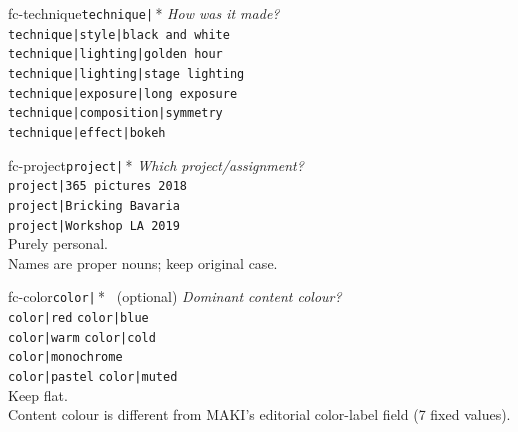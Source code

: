 \documentclass[a3paper,landscape,10pt]{article}
\newcommand{\cmd}[1]{\texttt{\small #1}}
\begin{document}
\begin{minipage}[t]{0.64\textwidth}
  \noindent
  \begin{minipage}[t]{0.244\textwidth}\begin{facetcard}{fc-technique}{\texttt{technique|}\,*}
    \textit{\small How was it made?}\\[3pt]
    \scriptsize
    \cmd{technique|style|black and white}\\
    \cmd{technique|lighting|golden hour}\\
    \cmd{technique|lighting|stage lighting}\\
    \cmd{technique|exposure|long exposure}\\
    \cmd{technique|composition|symmetry}\\
    \cmd{technique|effect|bokeh}
  \end{facetcard}\end{minipage}\hfill
  \begin{minipage}[t]{0.244\textwidth}\begin{facetcard}{fc-project}{\texttt{project|}\,*}
    \textit{\small Which project/assignment?}\\[3pt]
    \scriptsize
    \cmd{project|365 pictures 2018}\\
    \cmd{project|Bricking Bavaria}\\
    \cmd{project|Workshop LA 2019}\\[2pt]
    {\color{maki-stone} Purely personal.\\
    Names are proper nouns; keep original case.}
  \end{facetcard}\end{minipage}\hfill
  \begin{minipage}[t]{0.244\textwidth}\begin{facetcard}{fc-color}{\texttt{color|}\,* \ \scriptsize(optional)}
    \textit{\small Dominant content colour?}\\[3pt]
    \scriptsize
    \cmd{color|red} \quad \cmd{color|blue}\\
    \cmd{color|warm} \quad \cmd{color|cold}\\
    \cmd{color|monochrome}\\
    \cmd{color|pastel} \quad \cmd{color|muted}\\[2pt]
    {\color{maki-stone} Keep flat.\\
    Content colour is different from MAKI's editorial
    color-label field (7 fixed values).}
  \end{facetcard}\end{minipage}\hfill

\end{minipage}
\end{document}
